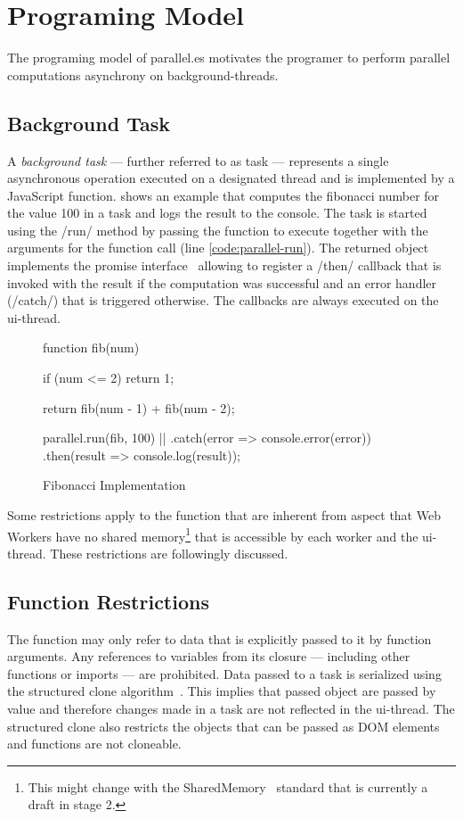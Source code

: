 \section{Programing Model}\label{sec:programing-model}
The programing model of parallel.es motivates the programer to perform parallel computations asynchrony on background-threads. 

\subsection{Background Task}
A \textit{background task} --- further referred to as task --- represents a single asynchronous operation executed on a designated thread and is implemented by a JavaScript function.  shows an example that computes the fibonacci number for the value 100 in a task and logs the result to the console. The task is started using the \javascriptinline/run/ method by passing the function to execute together with the arguments for the function call (line \ref{code:parallel-run}). The returned object implements the promise interface~\cite[Section 18.3.18]{ecmaScript2015} allowing to register a \javascriptinline/then/ callback that is invoked with the result if the computation was successful and an error handler (\javascriptinline/catch/) that is triggered otherwise. The callbacks are always executed on the ui-thread. 


\begin{figure}
	\begin{javascriptcode}
function fib(num) {
	if (num <= 2) {
    	return 1;
	}

	return fib(num - 1) + fib(num - 2);
}
        
parallel.run(fib, 100) |$\label{code:parallel-run}$|
	.catch(error => console.error(error))
	.then(result => console.log(result));	
	\end{javascriptcode}

	\caption{Fibonacci Implementation}
	\label{fig:fibonacci-implementation}
\end{figure}

Some restrictions apply to the function that are inherent from aspect that Web Workers have no shared memory\footnote{This might change with the SharedMemory~\cite{Ecma2016} standard that is currently a draft in stage 2.} that is accessible by each worker and the ui-thread. These restrictions are followingly discussed.

\subsection{Function Restrictions}
The function may only refer to data that is explicitly passed to it by function arguments. Any references to variables from its closure --- including other functions or imports --- are prohibited. Data passed to a task is serialized using the structured clone algorithm~\cite[Section 2.9.4]{WHATWG2016}. This implies that passed object are passed by value and therefore changes made in a task are not reflected in the ui-thread. The structured clone also restricts the objects that can be passed as DOM elements and functions are not cloneable. 

